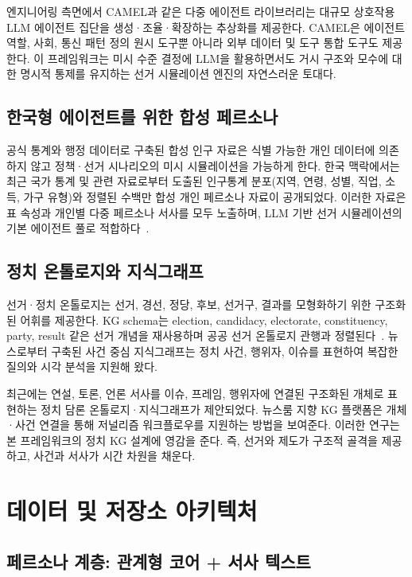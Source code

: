 \documentclass[11pt]{article}
\begin{document}
엔지니어링 측면에서 CAMEL과 같은 다중 에이전트 라이브러리는 대규모 상호작용 LLM 에이전트 집단을 생성·조율·확장하는 추상화를 제공한다. CAMEL은 에이전트 역할, 사회, 통신 패턴 정의 원시 도구뿐 아니라 외부 데이터 및 도구 통합 도구도 제공한다. 이 프레임워크는 미시 수준 결정에 LLM을 활용하면서도 거시 구조와 모수에 대한 명시적 통제를 유지하는 선거 시뮬레이션 엔진의 자연스러운 토대다.

\subsection{한국형 에이전트를 위한 합성 페르소나}

공식 통계와 행정 데이터로 구축된 합성 인구 자료은 식별 가능한 개인 데이터에 의존하지 않고 정책·선거 시나리오의 미시 시뮬레이션을 가능하게 한다. 한국 맥락에서는 최근 국가 통계 및 관련 자료로부터 도출된 인구통계 분포(지역, 연령, 성별, 직업, 소득, 가구 유형)와 정렬된 수백만 합성 개인 페르소나 자료이 공개되었다. 이러한 자료은 표 속성과 개인별 다중 페르소나 서사를 모두 노출하며, LLM 기반 선거 시뮬레이션의 기본 에이전트 풀로 적합하다~\cite{bhattacharjee2024nemotron}.

\subsection{정치 온톨로지와 지식그래프}

선거·정치 온톨로지는 선거, 경선, 정당, 후보, 선거구, 결과를 모형화하기 위한 구조화된 어휘를 제공한다. KG schema는 election, candidacy, electorate, constituency, party, result 같은 선거 개념을 재사용하며 공공 선거 온톨로지 관행과 정렬된다~\cite{ukparl_election_ontology}. 뉴스로부터 구축된 사건 중심 지식그래프는 정치 사건, 행위자, 이슈를 표현하여 복잡한 질의와 시각 분석을 지원해 왔다.

최근에는 연설, 토론, 언론 서사를 이슈, 프레임, 행위자에 연결된 구조화된 개체로 표현하는 정치 담론 온톨로지·지식그래프가 제안되었다. 뉴스룸 지향 KG 플랫폼은 개체·사건 연결을 통해 저널리즘 워크플로우를 지원하는 방법을 보여준다. 이러한 연구는 본 프레임워크의 정치 KG 설계에 영감을 준다. 즉, 선거와 제도가 구조적 골격을 제공하고, 사건과 서사가 시간 차원을 채운다.

\section{데이터 및 저장소 아키텍처}

\subsection{페르소나 계층: 관계형 코어 + 서사 텍스트}
\end{document}
